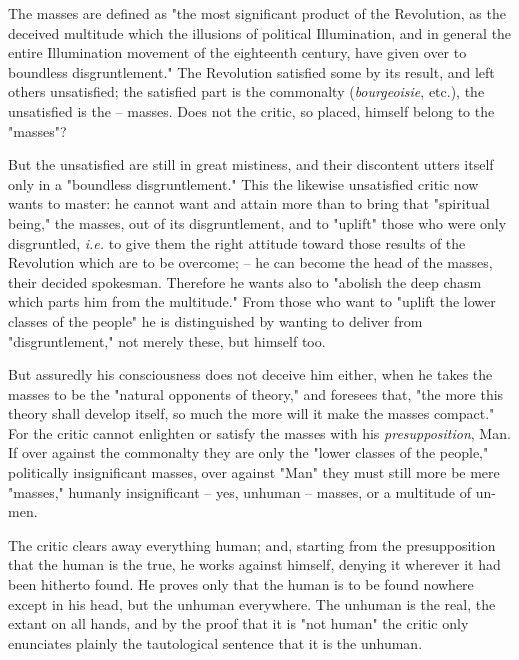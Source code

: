 \documentclass[a4paper]{book}
\begin{document}
The masses are defined as "{}the most significant product of the Revolution, 
as the deceived multitude which the illusions of political Illumination, and 
in general the entire Illumination movement of the eighteenth century, have 
given over to boundless disgruntlement."{} The Revolution satisfied some by 
its result, and left others unsatisfied; the satisfied part is the commonalty 
(\textit{bourgeoisie}, etc.), the unsatisfied is the -- masses. Does not the 
critic, so placed, himself belong to the "{}masses"{}?

But the unsatisfied are still in great mistiness, and their discontent utters 
itself only in a "{}boundless disgruntlement."{} This the likewise unsatisfied 
critic now wants to master: he cannot want and attain more than to bring that 
"{}spiritual being,"{} the masses, out of its disgruntlement, and to 
"{}uplift"{} those who were only disgruntled, \textit{i.e.} to give them the 
right attitude toward those results of the Revolution which are to be 
overcome; -- he can become the head of the masses, their decided spokesman. 
Therefore he wants also to "{}abolish the deep chasm which parts him from the 
multitude."{} From those who want to "{}uplift the lower classes of the 
people"{} he is distinguished by wanting to deliver from "{}disgruntlement,"{} 
not merely these, but himself too.

But assuredly his consciousness does not deceive him either, when he takes the 
masses to be the "{}natural opponents of theory,"{} and foresees that, "{}the 
more this theory shall develop itself, so much the more will it make the 
masses compact."{} For the critic cannot enlighten or satisfy the masses with 
his \textit{presupposition}, Man. If over against the commonalty they are only 
the "{}lower classes of the people,"{} politically insignificant masses, over 
against "{}Man"{} they must still more be mere "{}masses,"{} humanly 
insignificant -- yes, unhuman -- masses, or a multitude of un-men.

The critic clears away everything human; and, starting from the presupposition 
that the human is the true, he works against himself, denying it wherever it 
had been hitherto found. He proves only that the human is to be found nowhere 
except in his head, but the unhuman everywhere. The unhuman is the real, the 
extant on all hands, and by the proof that it is "{}not human"{} the critic 
only enunciates plainly the tautological sentence that it is the unhuman.
\end{document}
